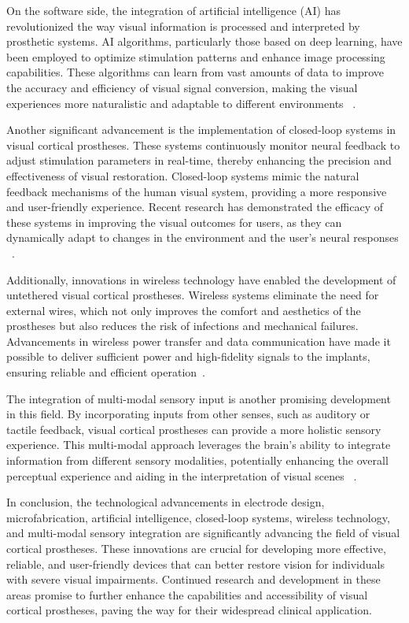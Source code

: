 \documentclass[twocolumn,10pt]{article}
\begin{document}
On the software side, the integration of artificial intelligence (AI) has
revolutionized the way visual information is processed and interpreted by
prosthetic systems. AI algorithms, particularly those based on deep learning,
have been employed to optimize stimulation patterns and enhance image processing
capabilities. These algorithms can learn from vast amounts of data to improve
the accuracy and efficiency of visual signal conversion, making the visual
experiences more naturalistic and adaptable to different environments
~\cite{romeniMachineLearningFramework2021}.

Another significant advancement is the implementation of closed-loop systems in
visual cortical prostheses. These systems continuously monitor neural feedback
to adjust stimulation parameters in real-time, thereby enhancing the precision
and effectiveness of visual restoration. Closed-loop systems mimic the natural
feedback mechanisms of the human visual system, providing a more responsive and
user-friendly experience. Recent research has demonstrated the efficacy of these
systems in improving the visual outcomes for users, as they can dynamically
adapt to changes in the environment and the user's neural responses
~\cite{leviEditorialClosedLoopSystems2018}.

Additionally, innovations in wireless technology have enabled the development of
untethered visual cortical prostheses. Wireless systems eliminate the need for
external wires, which not only improves the comfort and aesthetics of the
prostheses but also reduces the risk of infections and mechanical failures.
Advancements in wireless power transfer and data communication have made it
possible to deliver sufficient power and high-fidelity signals to the implants,
ensuring reliable and efficient
operation~\cite{rosenfeldTissueResponseChronically2020}.

The integration of multi-modal sensory input is another promising development in
this field. By incorporating inputs from other senses, such as auditory or
tactile feedback, visual cortical prostheses can provide a more holistic sensory
experience. This multi-modal approach leverages the brain's ability to integrate
information from different sensory modalities, potentially enhancing the overall
perceptual experience and aiding in the interpretation of visual scenes
~\cite{wanArtificialSensoryNeuron2020}.

In conclusion, the technological advancements in electrode design,
microfabrication, artificial intelligence, closed-loop systems, wireless
technology, and multi-modal sensory integration are significantly advancing the
field of visual cortical prostheses. These innovations are crucial for
developing more effective, reliable, and user-friendly devices that can better
restore vision for individuals with severe visual impairments. Continued
research and development in these areas promise to further enhance the
capabilities and accessibility of visual cortical prostheses, paving the way for
their widespread clinical application.
\end{document}
